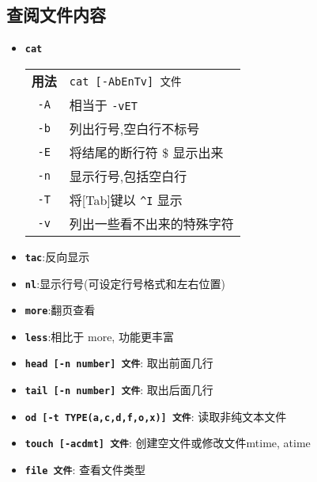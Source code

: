 \subsection{查阅文件内容}
\begin{itemize}

\item \textbf{\texttt{cat}}
  \begin{longtable}{c@{: }p{}}\hline\hline

    \textbf{用法} & \verb"cat [-AbEnTv] 文件"
    \\

    \texttt{-A} & 相当于 \texttt{-vET}  \\

     \texttt{-b}  &  列出行号,空白行不标号  \\

    \texttt{-E} & 将结尾的断行符 \$ 显示出来 \\

     \texttt{-n} & 显示行号,包括空白行  \\

     \texttt{-T}  &  将[Tab]键以 \verb|^I| 显示  \\

    \texttt{-v} & 列出一些看不出来的特殊字符 \\

    \hline
  \end{longtable}

\item \textbf{\texttt{tac}}:反向显示

\item \textbf{\texttt{nl}}:显示行号(可设定行号格式和左右位置)

\item \textbf{\texttt{more}}:翻页查看

\item \textbf{\texttt{less}}:相比于 more, 功能更丰富

\item \textbf{\texttt{head [-n number] 文件}}: 取出前面几行

\item \textbf{\texttt{tail [-n number] 文件}}: 取出后面几行

\item \textbf{\texttt{od [-t TYPE(a,c,d,f,o,x)] 文件}}: 读取非纯文本文件

\item \textbf{\texttt{touch [-acdmt] 文件}}: 创建空文件或修改文件mtime, atime

\item \textbf{\texttt{file 文件}}: 查看文件类型

\end{itemize}

